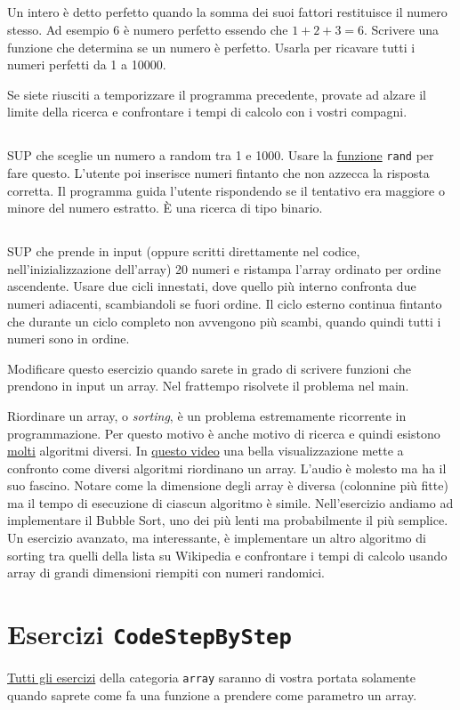 \documentclass{article}
\begin{document}
\subsection{}
Un intero è detto perfetto quando la somma dei suoi fattori restituisce il numero stesso. Ad esempio 6 è numero perfetto essendo che $1 + 2 + 3 = 6$. Scrivere una funzione che determina se un numero è perfetto. Usarla per ricavare tutti i numeri perfetti da 1 a 10000. 
\begin{info} 
	Se siete riusciti a temporizzare il programma precedente, provate ad alzare il limite della ricerca e confrontare i tempi di calcolo con i vostri compagni.
\end{info}

\subsection{}
SUP che sceglie un numero a random tra 1 e 1000. Usare la \href{http://www.cplusplus.com/reference/cstdlib/rand/}{funzione} \texttt{rand} per fare questo. L'utente poi inserisce numeri fintanto che non azzecca la risposta corretta. Il programma guida l'utente rispondendo se il tentativo era maggiore o minore del numero estratto. È una ricerca di tipo binario.

\subsection{}
SUP che prende in input (oppure scritti direttamente nel codice, nell'inizializzazione dell'array) 20 numeri e ristampa l'array ordinato per ordine ascendente. Usare due cicli  innestati, dove quello più interno confronta due numeri adiacenti, scambiandoli se fuori ordine. Il ciclo esterno continua fintanto che durante un ciclo completo non avvengono più scambi, quando quindi tutti i numeri sono in ordine.

\begin{warn}
	Modificare questo esercizio quando sarete in grado di scrivere funzioni che prendono in input un array. Nel frattempo risolvete il problema nel main.
\end{warn}
\begin{info}
	Riordinare un array, o \textit{sorting}, è un problema estremamente ricorrente in programmazione. Per questo motivo è anche motivo di ricerca e quindi esistono \href{https://en.wikipedia.org/wiki/Sorting_algorithm}{molti} algoritmi diversi. In \href{https://www.youtube.com/watch?v=kPRA0W1kECg}{questo video} una bella visualizzazione mette a confronto come  diversi algoritmi riordinano un array. L'audio è molesto ma ha il suo fascino. Notare come la dimensione degli array è diversa (colonnine più fitte) ma il tempo di esecuzione di ciascun algoritmo è simile. Nell'esercizio andiamo ad implementare il Bubble Sort, uno dei più lenti ma probabilmente il più semplice. Un esercizio avanzato, ma interessante, è implementare un altro algoritmo di sorting tra quelli della lista su Wikipedia e confrontare i tempi di calcolo usando array di grandi dimensioni riempiti con numeri randomici. 
\end{info}

\section*{Esercizi \texttt{CodeStepByStep}}
\href{https://www.codestepbystep.com/problem/list/cpp}{Tutti gli esercizi} della categoria \texttt{array} saranno di vostra portata solamente quando saprete come fa una funzione a prendere come parametro un array.
\end{document}
